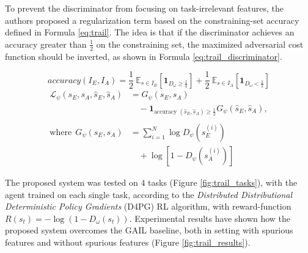 To prevent the discriminator from focusing on task-irrelevant features, the authors proposed a regularization term based on the constraining-set accuracy defined in Formula \ref{eq:trail}. The idea is that if the discriminator achieves an accuracy greater than $\frac{1}{2}$ on the constraining set, the maximized adversarial cost function should be inverted, as shown in Formula \ref{eq:trail_discriminator}.

\begin{equation}
\label{eq:trail}
\textit{accuracy}(I_{E}, I_{A}) = \frac{1}{2} \ \mathbb{E}_{s \in I_{E}} \left[ \mathbf{1}_{D_{\omega} \geq  \frac{1}{2}}\right] + \frac{1}{2} \ \mathbb{E}_{s \in I_{A}} \left[ \mathbf{1}_{D_{\omega} <  \frac{1}{2}}\right] 
\end{equation}
\begin{equation}
    \label{eq:trail_discriminator}
    \begin{aligned}
        \mathcal{L}_\psi\left(s_E, s_A, \hat{s}_E, \hat{s}_A\right) 
        &= G_\psi\left(s_E, s_A\right) \\
        &\quad - \mathbf{1}_{\text {accuracy }\left(\hat{s}_E, \hat{s}_A\right) \geq \frac{1}{2}} G_\psi\left(\hat{s}_E, \hat{s}_A\right), \\ \\
        \text{where} \ \ G_\psi\left(s_E, s_A\right) 
        &= \sum_{i=1}^N \log D_\psi\left(s_E^{(i)}\right) \\
        &\quad + \log \left[1 - D_\psi\left(s_A^{(i)}\right)\right]
    \end{aligned}
\end{equation}

The proposed system was tested on 4 tasks (Figure \ref{fig:trail_tasks}), with the agent trained on each single task, according to the \textit{Distributed Distributional Deterministic Policy Gradients} (D4PG) \cite{barth2018d4pg} RL algorithm, with reward-function $R(s_{t}) = - \log(1-D_{\omega}(s_{t}))$. Experimental results have shown how the proposed system overcomes the GAIL \cite{ho2016gail} baseline, both in setting with spurious features and without spurious features (Figure \ref{fig:trail_results}).



